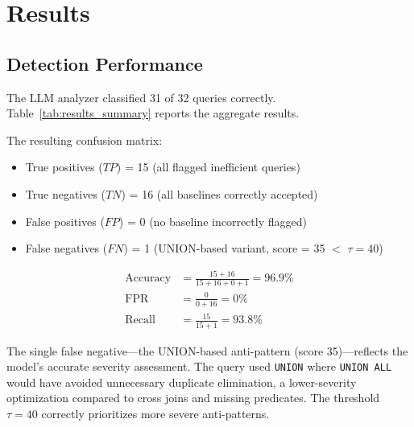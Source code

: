\documentclass[conference]{IEEEtran}
\begin{document}
\section{Results}
\subsection{Detection Performance}
The LLM analyzer classified 31 of 32 queries correctly. Table~\ref{tab:results_summary} reports the aggregate results.

\begin{table}[t]
\caption{Aggregate Results Summary}
\label{tab:results_summary}
\centering
{}
\end{table}

The resulting confusion matrix:
\begin{itemize}
\item True positives ($TP$) = 15 (all flagged inefficient queries)
\item True negatives ($TN$) = 16 (all baselines correctly accepted)
\item False positives ($FP$) = 0 (no baseline incorrectly flagged)
\item False negatives ($FN$) = 1 (UNION-based variant, score = 35 $<$ $\tau = 40$)
\end{itemize}

\begin{align}
\text{Accuracy} &= \frac{15 + 16}{15 + 16 + 0 + 1} = 96.9\% \nonumber \\
\text{FPR} &= \frac{0}{0 + 16} = 0\% \nonumber \\
\text{Recall} &= \frac{15}{15 + 1} = 93.8\%
\label{eq:detection_results}
\end{align}

The single false negative---the UNION-based anti-pattern (score 35)---reflects the model's accurate severity assessment. The query used \texttt{UNION} where \texttt{UNION ALL} would have avoided unnecessary duplicate elimination, a lower-severity optimization compared to cross joins and missing predicates. The threshold $\tau = 40$ correctly prioritizes more severe anti-patterns.
\end{document}

